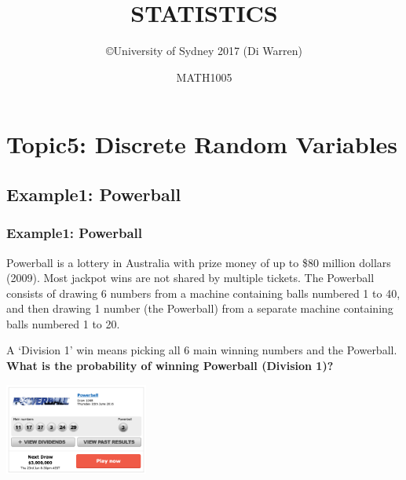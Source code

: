 \documentclass[t,xcolor=pdftex,dvipsnames,table]{beamer}
\title{\Huge STATISTICS}
\subtitle{}
\author{\copyright University of Sydney 2017 (Di Warren)}
\date{MATH1005}
\begin{document}
\section[5]{Topic5: Discrete Random Variables}

\subsection{Example1: Powerball}
\begin{frame}\frametitle{Example1: Powerball}

Powerball is a lottery in Australia with prize money of up to   \$80 million dollars (2009). Most jackpot wins are not shared by multiple tickets. The Powerball consists of drawing 6 numbers from a machine containing balls numbered 1 to 40, and then drawing 1 number (the Powerball) from a separate machine containing balls numbered 1 to 20.

\vspace{.5cm}
A `Division 1' win means picking all 6 main winning numbers and the Powerball.
{\bf What is the probability of winning Powerball (Division 1)?}

\begin{center}
\includegraphics[height=3cm]{../images/Powerball.jpg}
\end{center}
\href{https://tatts.com/goldencasket/games/powerball/how-to-play}{}

\end{frame}
\end{document}
